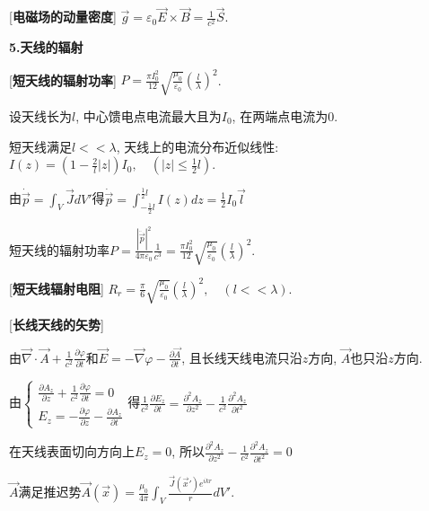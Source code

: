 \clearpage

[\textbf{电磁场的动量密度}] $\vec g=\varepsilon_0\vec E\times\vec B=\frac{1}{c^2}\vec S$.\par

\begin{center}
 \textbf{5.天线的辐射}
\end{center}

[\textbf{短天线的辐射功率}] $P=\frac{\pi I_0^2}{12}\sqrt{\frac{\mu_0}{\varepsilon_0}}\left(\frac{l}{\lambda}\right)^2$.\par
\qquad 设天线长为$l$, 中心馈电点电流最大且为$I_0$, 在两端点电流为$0$.\par
\qquad 短天线满足$l<<\lambda$, 天线上的电流分布近似线性:$I(z)=\left(1-\frac{2}{l}|z|\right)I_0,\quad (|z|\le \frac{1}{2}l)$.\par
\qquad 由$\dot{\vec p}=\int_V\vec JdV'$得$\dot{\vec p}=\int_{-\frac{1}{2}l}^{\frac{1}{2}l}I(z)dz=\frac{1}{2}I_0\vec l$\par
\qquad 短天线的辐射功率$P=\frac{|\ddot{\vec p}|^2}{4\pi\varepsilon_0}\frac{1}{c^3}=\frac{\pi I_0^2}{12}\sqrt{\frac{\mu_0}{\varepsilon_0}}\left(\frac{l}{\lambda}\right)^2$.\par

[\textbf{短天线辐射电阻}] $R_r=\frac{\pi}{6}\sqrt{\frac{\mu_0}{\varepsilon_0}}\left(\frac{l}{\lambda}\right)^2,\quad (l<<\lambda)$.\par

[\textbf{长线天线的矢势}]\par
\qquad 由$\vec\nabla\cdot\vec A+\frac{1}{c^2}\frac{\partial\varphi}{\partial t}$和$\vec E=-\vec\nabla\varphi-\frac{\partial\vec A}{\partial t}$, 且长线天线电流只沿$z$方向, $\vec A$也只沿$z$方向.\par
\qquad 由$\begin{cases}\frac{\partial A_z}{\partial z}+\frac{1}{c^2}\frac{\partial \varphi}{\partial t}=0\\ E_z=-\frac{\partial\varphi}{\partial z}-\frac{\partial A_z}{\partial t}\end{cases}$得$\frac{1}{c^2}\frac{\partial E_z}{\partial t}=\frac{\partial^2A_z}{\partial z^2}-\frac{1}{c^2}\frac{\partial^2A_z}{\partial t^2}$\par
\qquad 在天线表面切向方向上$E_z=0$, 所以$\frac{\partial^2A_z}{\partial z^2}-\frac{1}{c^2}\frac{\partial^2A_z}{\partial t^2}=0$\par
\qquad $\vec A$满足推迟势$\vec A(\vec x)=\frac{\mu_0}{4\pi}\int_V\frac{\vec J(\vec x')e^{ikr}}{r}dV'$.\par

